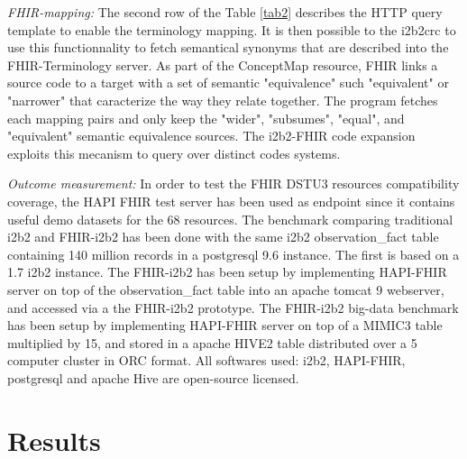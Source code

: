 \documentclass{amia}
\begin{document}
\textit{FHIR-mapping:} The second row of the Table \ref{tab2} describes the HTTP query template to enable the terminology mapping. It is then possible to the i2b2crc to use this functionnality to fetch semantical synonyms that are described into the FHIR-Terminology server. As part of the ConceptMap\cite{ref15} resource, FHIR links a source code to a target with a set of semantic "equivalence" such "equivalent" or "narrower" that caracterize the way they relate together. The program fetches each mapping pairs and only keep the "wider", "subsumes", "equal", and "equivalent" semantic equivalence sources. The i2b2-FHIR code expansion exploits this mecanism to query over distinct codes systems.



\textit{Outcome measurement:} In order to test the FHIR DSTU3 resources compatibility coverage, the HAPI FHIR test server has been used as endpoint since it contains useful demo datasets for the 68 resources. The benchmark comparing traditional i2b2 and FHIR-i2b2 has been done with the same i2b2 observation\_fact table containing 140 million records in a postgresql 9.6 instance. The first is based on a 1.7 i2b2 instance. The FHIR-i2b2 has been setup by implementing HAPI-FHIR server on top of the observation\_fact table into an apache tomcat 9 webserver, and accessed via a the FHIR-i2b2 prototype. The FHIR-i2b2 big-data benchmark has been setup by implementing HAPI-FHIR server on top of a MIMIC3\cite{ref17} table multiplied by 15, and stored in a apache HIVE2 table distributed over a 5 computer cluster in ORC format.
All softwares used: i2b2, HAPI-FHIR, postgresql and apache Hive are open-source licensed.

\section*{Results}
\end{document}
